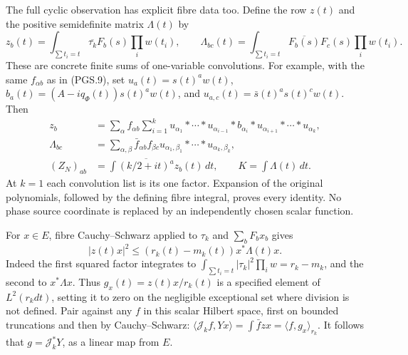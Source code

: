 The full cyclic observation has explicit fibre data too. Define
the row \(z(t)\) and the positive semidefinite matrix
\(\Lambda(t)\) by
\[
 z_b(t)=\int_{\sum t_i=t}\overline{\tau_k}F_b(s)\prod_iw(t_i),
 \qquad
 \Lambda_{bc}(t)=\int_{\sum t_i=t}\overline{F_b(s)}F_c(s)
                                                    \prod_iw(t_i).
\tag{PGS.37}\label{GraphV2:eq:pgs-fibre-data}
\]
These are concrete finite sums of one-variable convolutions.
For example, with the same \(f_{\alpha b}\) as in (PGS.9), set
\(u_a(t)=s(t)^aw(t)\),
\(b_a(t)=(A-iq_\Phi(t))s(t)^aw(t)\), and
\(u_{a,c}(t)=\bar s(t)^as(t)^cw(t)\). Then
\[
\begin{aligned}
 z_b&=\sum_{\alpha}f_{\alpha b}\sum_{i=1}^k
       u_{\alpha_1}*\cdots*u_{\alpha_{i-1}}*b_{\alpha_i}
               *u_{\alpha_{i+1}}*\cdots*u_{\alpha_k},\\
 \Lambda_{bc}&=\sum_{\alpha,\beta}\bar f_{\alpha b}f_{\beta c}
                u_{\alpha_1,\beta_1}*\cdots*u_{\alpha_k,\beta_k},\\
 (Z_N)_{ab}&=\int\overline{(k/2+it)^a}z_b(t)\,dt,\qquad
 K=\int\Lambda(t)\,dt.
\end{aligned}
\tag{PGS.38}\label{GraphV2:eq:pgs-cross-convolutions}
\]
At \(k=1\) each convolution list is its one factor. Expansion
of the original polynomials, followed by the defining fibre
integral, proves every identity. No phase source coordinate is
replaced by an independently chosen scalar function.

For \(x\in E\), fibre Cauchy--Schwarz applied to
\(\tau_k\) and \(\sum_bF_bx_b\) gives
\[
 |z(t)x|^2\le(r_k(t)-m_k(t))x^*\Lambda(t)x.
\tag{PGS.39}\label{GraphV2:eq:pgs-fibre-CS}
\]
Indeed the first squared factor integrates to
\(\int_{\sum t_i=t}|\tau_k|^2\prod_iw=r_k-m_k\),
and the second to \(x^*\Lambda x\). Thus
\(g_x(t)=z(t)x/r_k(t)\) is a specified element of \(L^2(r_kdt)\),
setting it to zero on the negligible exceptional set where division
is not defined. Pair against any \(f\) in this scalar Hilbert
space, first on bounded truncations and then by Cauchy--Schwarz:
\(\langle\mathscr J_kf,Yx\rangle=\int\bar f zx
=\langle f,g_x\rangle_{r_k}\). It follows that
\(g=\mathscr J_k^*Y\), as a linear map from \(E\).

